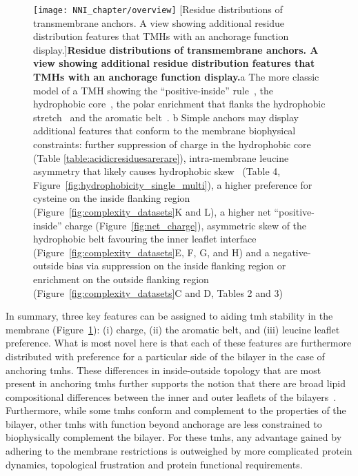 \begin{figure}[!ht]
\centering
\texttt{[image: NNI\_chapter/overview]}
[Residue distributions of transmembrane anchors. A view showing additional residue distribution features that TMHs with an anchorage function display.]{\textbf{Residue distributions of transmembrane anchors. A view showing additional residue distribution features that TMHs with an anchorage function display.}a The more classic model of a TMH showing the ``positive-inside'' rule~\cite{VonHeijne1989}, the hydrophobic core~\cite{Kyte1982}, the polar enrichment that flanks the hydrophobic stretch~\cite{Baeza-Delgado2013} and the aromatic belt~\cite{Granseth2005}. b Simple anchors may display additional features that conform to the membrane biophysical constraints: further suppression of charge in the hydrophobic core (Table \ref{table:acidicresiduesarerare}), intra-membrane leucine asymmetry that likely causes hydrophobic skew~\cite{Sharpe2010} (Table 4, Figure~\ref{fig:hydrophobicity_single_multi}), a higher preference for cysteine on the inside flanking region (Figure~\ref{fig:complexity_datasets}K and L), a higher net ``positive-inside'' charge (Figure~\ref{fig:net_charge}), asymmetric skew of the hydrophobic belt favouring the inner leaflet interface (Figure~\ref{fig:complexity_datasets}E, F, G, and H) and a negative-outside bias via suppression on the inside flanking region or enrichment on the outside flanking region (Figure~\ref{fig:complexity_datasets}C and D, Tables 2 and 3)}

\label{fig:overview}
\end{figure}

In summary, three key features can be assigned to aiding \gls{tmh} stability in the membrane (Figure~\ref{fig:overview}): (i) charge, (ii) the aromatic belt, and (iii) leucine leaflet preference. What is most novel here is that each of these features are furthermore distributed with preference for a particular side of the bilayer in the case of anchoring \gls{tmh}s. These differences in inside-outside topology that are most present in anchoring \gls{tmh}s further supports the notion that there are broad lipid compositional differences between the inner and outer leaflets of the bilayers~\cite{Sharpe2010}. Furthermore, while some \gls{tmh}s conform and complement to the properties of the bilayer, other \gls{tmh}s with function beyond anchorage are less constrained to biophysically complement the bilayer. For these \gls{tmh}s, any advantage gained by adhering to the membrane restrictions is outweighed by more complicated protein dynamics, topological frustration and protein functional requirements.


